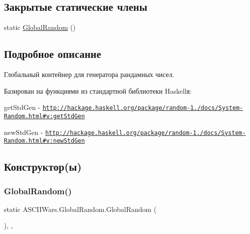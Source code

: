 \subsection*{Закрытые статические члены}
\begin{DoxyCompactItemize}
\item 
static \hyperlink{class_a_s_c_i_i_wars_1_1_global_random_a650d98f5b3610bf7f169d94064c33d96}{Global\+Random} ()
\end{DoxyCompactItemize}


\subsection{Подробное описание}
Глобальный контейнер для генератора рандамных чисел. 

Базирован на функциями из стандартной библиотеки Haskell\textquotesingle{}я\+:
\begin{DoxyItemize}
\item {\ttfamily get\+Std\+Gen} -\/ \href{http://hackage.haskell.org/package/random-1.1/docs/System-Random.html#v:getStdGen}{\tt http\+://hackage.\+haskell.\+org/package/random-\/1./docs/\+System-\/\+Random.\+html\#v\+:get\+Std\+Gen}
\item {\ttfamily new\+Std\+Gen} -\/ \href{http://hackage.haskell.org/package/random-1.1/docs/System-Random.html#v:newStdGen}{\tt http\+://hackage.\+haskell.\+org/package/random-\/1./docs/\+System-\/\+Random.\+html\#v\+:new\+Std\+Gen} 
\end{DoxyItemize}

\subsection{Конструктор(ы)}
\hypertarget{class_a_s_c_i_i_wars_1_1_global_random_a650d98f5b3610bf7f169d94064c33d96}{}\label{class_a_s_c_i_i_wars_1_1_global_random_a650d98f5b3610bf7f169d94064c33d96} 
\subsubsection{\texorpdfstring{Global\+Random()}{GlobalRandom()}}
{\footnotesize\ttfamily static A\+S\+C\+I\+I\+Wars.\+Global\+Random.\+Global\+Random (\begin{DoxyParamCaption}{ }\end{DoxyParamCaption})\hspace{0.3cm}{\ttfamily [inline]}, {\ttfamily [static]}, {\ttfamily [private]}}



